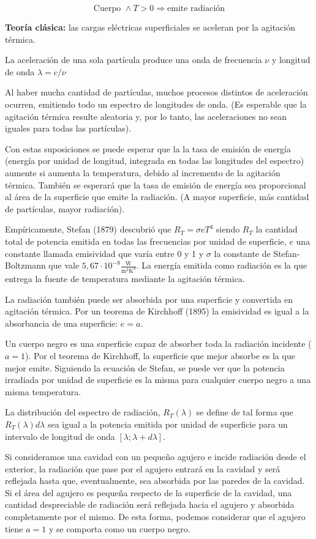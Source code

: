 \documentclass{article}
\begin{document}
\[ \textrm{Cuerpo } \wedge T>0 \Longrightarrow \textrm{emite radiación} \]

\textbf{Teoría clásica:} las cargas eléctricas superficiales se aceleran por la agitación térmica.

La aceleración de una sola partícula produce una onda de frecuencia $\nu$ y longitud de onda $\lambda = c/\nu$

Al haber  mucha cantidad de partículas, muchos procesos distintos de aceleración ocurren, emitiendo todo un espectro de longitudes de onda. (Es esperable que la agitación térmica resulte aleatoria y, por lo tanto, las aceleraciones no sean iguales para todas las partículas).

Con estas suposiciones se puede esperar que la la tasa de emisión de energía (energía por unidad de longitud, integrada en todas las longitudes del espectro) aumente si aumenta la temperatura, debido al incremento de la agitación térmica. También se esperará que la tasa de emisión de energía sea proporcional al área de la superficie que emite la radiación. (A mayor superficie, más cantidad de partículas, mayor radiación).

Empíricamente, Stefan (1879) descubrió que $R_{T} = \sigma e T^{4}$ siendo $R_{T}$ la cantidad total de potencia emitida en todas las frecuencias por unidad de superficie, $e$ una constante llamada emisividad que varía entre 0 y 1 y $\sigma$ la constante de Stefan-Boltzmann que vale $5,67 \cdot 10^{-8} \frac{\textrm{W}}{\textrm{m}^{2}\textrm{K}^{4}}$. La energía emitida como radiación es la que entrega la fuente de temperatura mediante la agitación térmica.

La radiación también puede ser absorbida por una superficie y convertida en agitación térmica. Por un teorema de Kirchhoff (1895) la emisividad es igual a la absorbancia de una superficie: $e=a$.

Un cuerpo negro es una superficie capaz de absorber toda la radiación incidente ($a=1$). Por el teorema de Kirchhoff, la superficie que mejor absorbe es la que mejor emite. Siguiendo la ecuación de Stefan, se puede ver que la potencia irradiada por unidad de superficie es la misma para cualquier cuerpo negro a una misma temperatura.

La distribución del espectro de radiación, $R_{T}(\lambda)$ se define de tal forma que $R_{T}(\lambda) d\lambda$ sea igual a la potencia emitida por unidad de superficie para un intervalo de longitud de onda $[ \lambda ;\lambda + d\lambda ]$.

Si consideramos una cavidad con un pequeño agujero e incide radiación desde el exterior, la radiación que pase por el agujero entrará en la cavidad y será reflejada hasta que, eventualmente, sea absorbida por las paredes de la cavidad. Si el área del agujero es pequeña respecto de la superficie de la cavidad, una cantidad despreciable de radiación será reflejada hacia el agujero y absorbida completamente por el mismo. De esta forma, podemos considerar que el agujero tiene $a=1$ y se comporta como un cuerpo negro.
\end{document}
